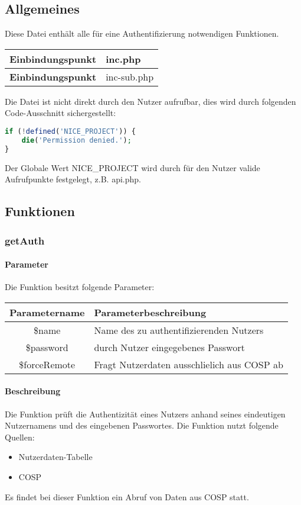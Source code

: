 \subsection{Allgemeines} Diese Datei enthält alle für eine Authentifizierung notwendigen Funktionen.
\begin{table}[H]
	\begin{tabular}{|c|p{11cm}|}
		\hline
		\textbf{Einbindungspunkt} & inc.php \\ \hline
		\textbf{Einbindungspunkt} & inc-sub.php \\ \hline
	\end{tabular}
\end{table}
Die Datei ist nicht direkt durch den Nutzer aufrufbar, dies wird durch folgenden Code-Ausschnitt sichergestellt:
\begin{lstlisting}[language=php]
if (!defined('NICE_PROJECT')) {
	die('Permission denied.');
}
\end{lstlisting}
Der Globale Wert {\glqq NICE\_PROJECT\grqq} wird durch für den Nutzer valide Aufrufpunkte festgelegt, z.B. {\glqq api.php\grqq}.
\newpage
\subsection{Funktionen}
\subsubsection{getAuth}
\paragraph{Parameter} Die Funktion besitzt folgende Parameter:
\begin{table}[H]
	\begin{tabular}{|c|p{11cm}|}
		\hline
		\textbf{Parametername} & \textbf{Parameterbeschreibung} \\ \hline
		\$name        & Name des zu authentifizierenden Nutzers \\ \hline
		\$password    & durch Nutzer eingegebenes Passwort \\ \hline
		\$forceRemote & Fragt Nutzerdaten ausschlielich aus {\glqq COSP\grqq} ab \\ \hline
	\end{tabular}
\end{table}
\paragraph{Beschreibung} Die Funktion prüft die Authentizität eines Nutzers anhand seines eindeutigen Nutzernamens und des eingebenen Passwortes. Die Funktion nutzt folgende Quellen:
\begin{itemize}
	\item Nutzerdaten-Tabelle
	\item COSP
\end{itemize}
Es findet bei dieser Funktion ein Abruf von Daten aus {\glqq COSP\grqq} statt.
